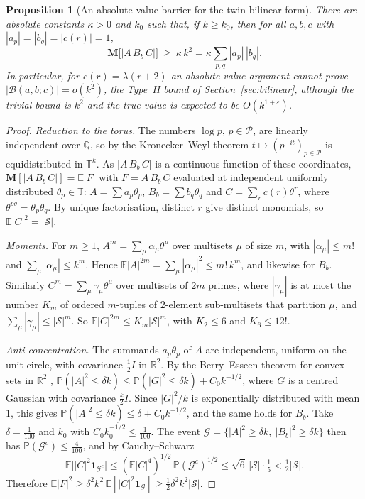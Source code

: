 \documentclass[11pt]{amsart}
\newtheorem{proposition}[theorem]{Proposition}
\theoremstyle{definition}
\theoremstyle{remark}
\begin{document}
\begin{proposition}[An absolute-value barrier for the twin bilinear form]\label{prop:absbarrier}
There are absolute constants $\kappa>0$ and $k_0$ such that, if $k\ge k_0$, then for all $a,b,c$ with $|a_p|=|b_q|=|c(r)|=1$,
\[
\mathbf M\bigl[|A\,B_b\,C|\bigr]\ \ge\ \kappa\,k^2=\kappa\sum_{p,q}|a_p|\,|b_q| .
\]
In particular, for $c(r)=\lambda(r+2)$ an absolute-value argument cannot prove $|\mathcal B(a,b;c)|=o(k^2)$, the Type~II bound of Section~\ref{sec:bilinear}, although the trivial bound is $k^2$ and the true value is expected to be $O(k^{1+\varepsilon})$.
\end{proposition}
\begin{proof}
\emph{Reduction to the torus.} The numbers $\log p$, $p\in\mathcal P$, are linearly independent over $\mathbb Q$, so by the Kronecker--Weyl theorem $t\mapsto(p^{-it})_{p\in\mathcal P}$ is equidistributed in $\mathbb T^k$. As $|A\,B_b\,C|$ is a continuous function of these coordinates, $\mathbf M[|A\,B_b\,C|]=\mathbb E|F|$ with $F=A\,B_b\,C$ evaluated at independent uniformly distributed $\theta_p\in\mathbb T$: $A=\sum a_p\theta_p$, $B_b=\sum b_q\theta_q$ and $C=\sum_rc(r)\theta^r$, where $\theta^{pq}=\theta_p\theta_q$. By unique factorisation, distinct $r$ give distinct monomials, so $\mathbb E|C|^2=|\mathcal S|$.

\emph{Moments.} For $m\ge1$, $A^m=\sum_\mu\alpha_\mu\theta^\mu$ over multisets $\mu$ of size $m$, with $|\alpha_\mu|\le m!$ and $\sum_\mu|\alpha_\mu|\le k^m$. Hence $\mathbb E|A|^{2m}=\sum_\mu|\alpha_\mu|^2\le m!\,k^m$, and likewise for $B_b$. Similarly $C^m=\sum_\mu\gamma_\mu\theta^\mu$ over multisets of $2m$ primes, where $|\gamma_\mu|$ is at most the number $K_m$ of ordered $m$-tuples of $2$-element sub-multisets that partition $\mu$, and $\sum_\mu|\gamma_\mu|\le|\mathcal S|^m$. So $\mathbb E|C|^{2m}\le K_m|\mathcal S|^m$, with $K_2\le6$ and $K_6\le12!$.

\emph{Anti-concentration.} The summands $a_p\theta_p$ of $A$ are independent, uniform on the unit circle, with covariance $\frac12I$ in $\mathbb R^2$. By the Berry--Esseen theorem for convex sets in $\mathbb R^2$ \cite{Ben05}, $\mathbb P(|A|^2\le\delta k)\le\mathbb P(|G|^2\le\delta k)+C_0k^{-1/2}$, where $G$ is a centred Gaussian with covariance $\frac k2I$. Since $|G|^2/k$ is exponentially distributed with mean $1$, this gives $\mathbb P(|A|^2\le\delta k)\le\delta+C_0k^{-1/2}$, and the same holds for $B_b$. Take $\delta=\frac1{100}$ and $k_0$ with $C_0k_0^{-1/2}\le\frac1{100}$. The event $\mathcal G=\{|A|^2\ge\delta k,\ |B_b|^2\ge\delta k\}$ then has $\mathbb P(\mathcal G^c)\le\frac4{100}$, and by Cauchy--Schwarz
\[
\mathbb E\bigl[|C|^2\mathbf 1_{\mathcal G^c}\bigr]\le(\mathbb E|C|^4)^{1/2}\,\mathbb P(\mathcal G^c)^{1/2}\le\sqrt6\,|\mathcal S|\cdot\tfrac15<\tfrac12|\mathcal S| .
\]
Therefore $\mathbb E|F|^2\ge\delta^2k^2\,\mathbb E[|C|^2\mathbf 1_{\mathcal G}]\ge\frac12\delta^2k^2|\mathcal S|$.


\end{proof}
\end{document}
